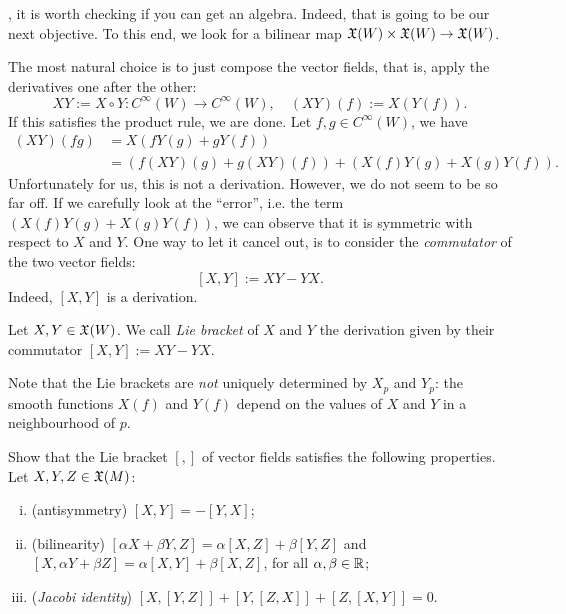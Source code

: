 , it is worth checking if you can get an algebra.
Indeed, that is going to be our next objective.
To this end, we look for a bilinear map $\mathfrak{X}(W)\times\mathfrak{X}(W) \to \mathfrak{X}(W)$.

The most natural choice is to just compose the vector fields, that is, apply the derivatives one after the other:
\begin{equation}
  X Y := X \circ Y : C^\infty(W) \to C^\infty(W), \quad
  (X Y)(f) := X(Y(f)).
\end{equation}
If this satisfies the product rule, we are done.
Let $f,g\in C^\infty(W)$, we have
\begin{align}
  (X Y)(fg) &= X(fY(g) + gY(f)) \\
  &= \left(f(X Y)(g) + g(X Y)(f)\right) + \left( X(f)Y(g) +X(g)Y(f)\right).
\end{align}
Unfortunately for us, this is not a derivation. However, we do not seem to be so far off.
If we carefully look at the ``error'', i.e. the term $\left( X(f)Y(g) +X(g)Y(f)\right)$, we can observe that it is symmetric with respect to $X$ and $Y$.
One way to let it cancel out, is to consider the \emph{commutator} of the two vector fields:
\begin{equation}\label{def:commutator}
    [X,Y] := X Y - Y X.
\end{equation}
Indeed, $[X,Y]$ is a derivation.

\begin{definition}
    Let $X,Y\in\mathfrak{X}(W)$. We call \emph{Lie bracket} of $X$ and $Y$ the derivation given by their commutator $[X,Y] := X Y - Y X$.
\end{definition}

\begin{remark}
  Note that the Lie brackets are \emph{not} uniquely determined by $X_p$ and $Y_p$: the smooth functions $X(f)$ and $Y(f)$ depend on the values of $X$ and $Y$ in a neighbourhood of $p$.
\end{remark}

\begin{exercise}\label{ex:vfliealgebra}
  Show that the Lie bracket $[,]$ of vector fields satisfies the following properties. Let $X,Y,Z\in\mathfrak{X}(M)$:
  \begin{enumerate}[(i)]
    \item (antisymmetry) $[X, Y] = - [Y, X]$;
    \item (bilinearity) $[\alpha X + \beta Y, Z] = \alpha [X, Z] + \beta [Y, Z]$ and $[X, \alpha Y + \beta Z] = \alpha [X, Y] + \beta [X, Z]$, for all $\alpha,\beta \in\mathbb{R}$;
    \item (\emph{Jacobi identity}) $[X,[Y,Z]] + [Y,[Z,X]] + [Z,[X,Y]] = 0$.
  \end{enumerate}
\end{exercise}

